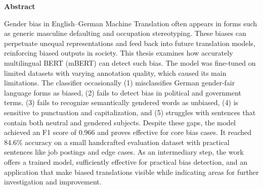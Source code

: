 \thispagestyle{empty}


\vspace*{1cm}

\begin{center}
    \textbf{Abstract}
\end{center}

\vspace*{1cm}

\noindent 
Gender bias in English–German Machine Translation often appears in forms such as generic masculine defaulting and occupation stereotyping. These biases can perpetuate unequal representations and feed back into future translation models, reinforcing biased outputs in society. This thesis examines how accurately multilingual BERT (mBERT) can detect such bias. The model was fine-tuned on limited datasets with varying annotation quality, which caused its main limitations. The classifier occasionally (1) misclassifies German gender-fair language forms as biased, (2) fails to detect bias in political and government terms, (3) fails to recognize semantically gendered words as unbiased, (4) is sensitive to punctuation and capitalization, and (5) struggles with sentences that contain both neutral and gendered subjects. Despite these gaps, the model achieved an F1 score of 0.966 and proves effective for core bias cases. It reached 84.6\% accuracy on a small handcrafted evaluation dataset with practical sentences like job postings and edge cases. As an intermediary step, the work offers a trained model, sufficiently effective for practical bias detection, and an application that make biased translations visible while indicating areas for further investigation and improvement.